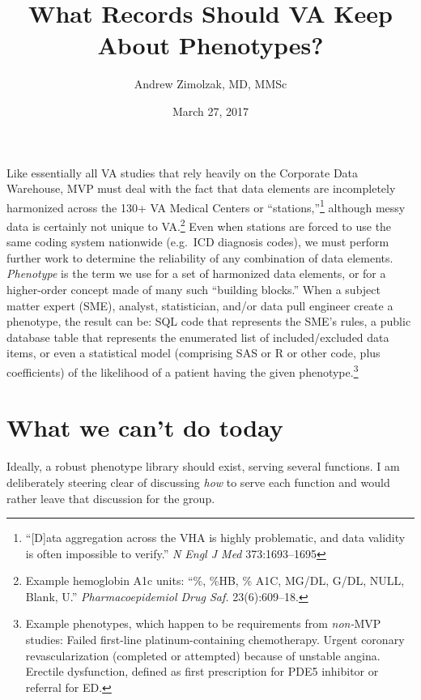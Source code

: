 \documentclass{tufte-handout}
\title{What Records Should VA Keep About Phenotypes?}
\author{Andrew Zimolzak, MD, MMSc}
\date{March 27, 2017}
\begin{document}
\maketitle

Like essentially all VA studies that rely heavily on the Corporate
Data Warehouse, MVP must deal with the fact that data elements are
incompletely harmonized across the 130+ VA Medical Centers or
``stations,''\footnote{``[D]ata aggregation across the VHA is highly
  problematic, and data validity is often impossible to verify.''
  \emph{N Engl J Med} 373:1693--1695} although messy data is certainly
not unique to VA.\footnote{Example hemoglobin A1c units: ``\%, \%HB,
  \% A1C, MG/DL, G/DL, NULL, Blank, U.'' \emph{Pharmacoepidemiol Drug
    Saf.} 23(6):609--18.} Even when stations are forced to use the
same coding system nationwide (e.g.\ ICD diagnosis codes), we must
perform further work to determine the reliability of any combination
of data elements. \emph{Phenotype} is the term we use for a set of
harmonized data elements, or for a higher-order concept made of many such
``building blocks.'' When a subject matter expert (SME), analyst,
statistician, and/or data pull engineer create a phenotype, the result
can be: SQL code that represents the SME's rules, a public database
table that represents the enumerated list of included\slash excluded
data items, or even a statistical model (comprising SAS or R or other
code, plus coefficients) of
the likelihood of a patient having the given
phenotype.\footnote{Example phenotypes, which happen to be
  requirements from \emph{non-}MVP studies: Failed first-line
  platinum-containing chemotherapy. Urgent coronary revascularization
  (completed or attempted) because of unstable angina. Erectile
  dysfunction, defined as first prescription for PDE5 inhibitor or
  referral for ED.}

\section{What we can't do today}

Ideally, a robust phenotype library should exist, serving several
functions. I am deliberately steering clear of discussing \emph{how}
to serve each function and would rather leave that discussion for the
group.
\end{document}
